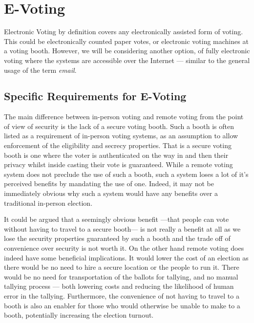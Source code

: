 
\chapter{E-Voting}
\label{ch:ev}

Electronic Voting by definition covers any electronically assisted form of voting. This could be electronically counted paper votes, or electronic voting machines at a voting booth. However, we will be considering another option, of fully electronic voting where the systems are accessible over the Internet --- similar to the general usage of the term \emph{email}.

\section{Specific Requirements for E-Voting}
\label{ch:ev:specific}

The main difference between in-person voting and remote voting from the point of view of security is the lack of a secure voting booth. Such a booth is often listed as a requirement of in-person voting systems, as an assumption to allow enforcement of the eligibility and secrecy properties. That is a secure voting booth is one where the voter is authenticated on the way in and then their privacy whilst inside casting their vote is guaranteed. While a remote voting system does not preclude the use of such a booth, such a system loses a lot of it's perceived benefits by mandating the use of one. Indeed, it may not be immediately obvious why such a system would have any benefits over a traditional in-person election.

It could be argued that a seemingly obvious benefit ---that people can vote without having to travel to a secure booth--- is not really a benefit at all as we lose the security properties guaranteed by such a booth and the trade off of convenience over security is not worth it. On the other hand remote voting does indeed have some beneficial implications. It would lower the cost of an election as there would be no need to hire a secure location or the people to run it. There would be no need for transportation of the ballots for tallying, and no manual tallying process --- both lowering costs and reducing the likelihood of human error in the tallying. Furthermore, the convenience of not having to travel to a booth is also an enabler for those who would otherwise be unable to make to a booth, potentially increasing the election turnout.

